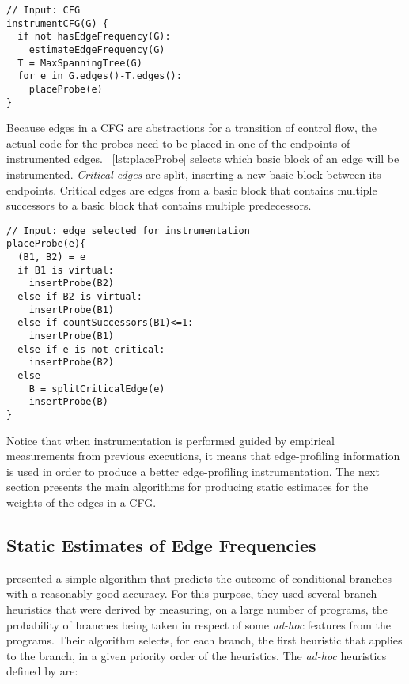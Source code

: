 \begin{lstlisting}[caption={Optimal placement of probes for block frequency.}, label={lst:instrumentCFG}]
// Input: CFG	
instrumentCFG(G) {
  if not hasEdgeFrequency(G):
    estimateEdgeFrequency(G)
  T = MaxSpanningTree(G)
  for e in G.edges()-T.edges():
    placeProbe(e)
}
\end{lstlisting}

Because edges in a CFG are abstractions for a transition of control flow,
the actual code for the probes need to be placed in one of the endpoints of instrumented edges.
\lstlistingname~\ref{lst:placeProbe} selects which basic block of an edge will be instrumented.
\textit{Critical edges} are split, inserting a new basic block between its endpoints.
Critical edges are edges from a basic block that contains multiple successors to a basic block that contains multiple predecessors.

\begin{lstlisting}[caption={For a given edge, this procedure selects which basic block to place the instrumented code.
                            If the edge is critical, an intermediate basic block is created for the instrumentation.}, label={lst:placeProbe}]
// Input: edge selected for instrumentation
placeProbe(e){
  (B1, B2) = e
  if B1 is virtual:
    insertProbe(B2)
  else if B2 is virtual:
    insertProbe(B1)
  else if countSuccessors(B1)<=1:
    insertProbe(B1)
  else if e is not critical:
    insertProbe(B2)
  else
    B = splitCriticalEdge(e)
    insertProbe(B)
}
\end{lstlisting}

Notice that when instrumentation is performed guided by empirical measurements from previous executions, it means that edge-profiling information is used in order to produce a better edge-profiling instrumentation.
The next section presents the main algorithms for producing static estimates for the weights of the edges in a CFG.

\subsection{Static Estimates of Edge Frequencies}

\cite{ball93} presented a simple algorithm that predicts the outcome of conditional branches with a reasonably good accuracy.
For this purpose, they used several branch heuristics that were derived by measuring, on a large number of programs, the probability of branches being taken in respect of some \textit{ad-hoc} features from the programs.
Their algorithm selects, for each branch, the first heuristic that applies to the branch, in a given priority order of the heuristics.
The \textit{ad-hoc} heuristics defined by \cite{ball93} are:

